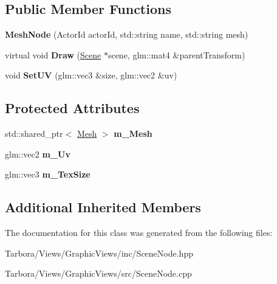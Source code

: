 \subsection*{Public Member Functions}
\begin{DoxyCompactItemize}
\item 
\mbox{\label{classTarbora_1_1MeshNode_ac8707ba03bcbd43176f5d8a01cb8a814}} 
{\bfseries Mesh\+Node} (Actor\+Id actor\+Id, std\+::string name, std\+::string mesh)
\item 
\mbox{\label{classTarbora_1_1MeshNode_af6e0518f98fc972ceac872669c837d77}} 
virtual void {\bfseries Draw} (\hyperlink{classTarbora_1_1Scene}{Scene} $\ast$scene, glm\+::mat4 \&parent\+Transform)
\item 
\mbox{\label{classTarbora_1_1MeshNode_a310d0e5d46197b54bf4f63ea47876ec2}} 
void {\bfseries Set\+UV} (glm\+::vec3 \&size, glm\+::vec2 \&uv)
\end{DoxyCompactItemize}
\subsection*{Protected Attributes}
\begin{DoxyCompactItemize}
\item 
\mbox{\label{classTarbora_1_1MeshNode_a31ccba7c83a72dd07ff7ee06bbc93328}} 
std\+::shared\+\_\+ptr$<$ \hyperlink{classTarbora_1_1Mesh}{Mesh} $>$ {\bfseries m\+\_\+\+Mesh}
\item 
\mbox{\label{classTarbora_1_1MeshNode_ac8b90dda0514d71ffddf36243063203b}} 
glm\+::vec2 {\bfseries m\+\_\+\+Uv}
\item 
\mbox{\label{classTarbora_1_1MeshNode_a8964635446ab4a46e509b07a3de41e0c}} 
glm\+::vec3 {\bfseries m\+\_\+\+Tex\+Size}
\end{DoxyCompactItemize}
\subsection*{Additional Inherited Members}


The documentation for this class was generated from the following files\+:\begin{DoxyCompactItemize}
\item 
Tarbora/\+Views/\+Graphic\+Views/inc/Scene\+Node.\+hpp\item 
Tarbora/\+Views/\+Graphic\+Views/src/Scene\+Node.\+cpp\end{DoxyCompactItemize}
